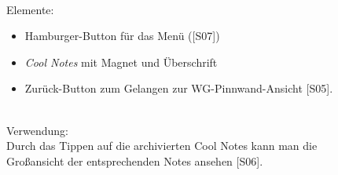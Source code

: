 \documentclass[a4paper]{scrreprt}
\begin{document}
\begin{figure}[h]
\begin{minipage}[b]{0.6\linewidth}
    			\hfill 
    			\\Elemente:
    			\begin{itemize}
    				\renewcommand\labelitemi{--}
    				\item Hamburger-Button für das Menü ({[}S07{]})
    				\item \textit{Cool Notes} mit Magnet und Überschrift
    				\item Zurück-Button zum Gelangen zur
    				WG-Pinnwand-Ansicht {[}S05{]}.
    				
    			\end{itemize}
    			
    			\hfill
    			\\
    			
    			Verwendung:\\
    			Durch das Tippen auf die archivierten Cool Notes
    			kann man die Großansicht der entsprechenden
    			Notes ansehen {[}S06{]}.
    			
    			\vspace{20mm}
    			
    		\end{minipage}
    	\end{figure}
    	
\end{document}
